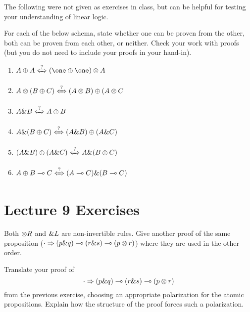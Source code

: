 \documentclass{article}
\begin{document}
The following were not given as exercises in class, but can be helpful
for testing your understanding of linear logic.

\newcommand{\eqhuh}{\xLeftrightarrow{\text{?}}}

\begin{exercise}
  For each of the below schema, state whether one can be proven from the
  other,
  both can be proven from each other, or neither.
  Check your work with proofs (but you do not need to include your proofs
  in your hand-in).
  \begin{enumerate}
    \item $A \oplus A \eqhuh (\one \oplus \one) \tensor A$
    \item $A \tensor (B \oplus C) \eqhuh (A \tensor B) \oplus (A \tensor
      C$
    \item $A \with B \eqhuh A \oplus B$
    \item $A \with (B \oplus C) \eqhuh (A \with B) \oplus (A \with C)$
    \item $(A \with B) \oplus (A \with C) \eqhuh A \with (B \oplus C)$
    \item $A \oplus B \lolli C \eqhuh (A \lolli C) \with (B \lolli C)$
  \end{enumerate}
\end{exercise}



\section{Lecture 9 Exercises}

\begin{exercise}
 Both $\otimes R$ and $\& L$ are non-invertible rules.
  Give another proof of the same proposition
  ($\cdot \Rightarrow (p \& q) \multimap (r \& s) \multimap (p \otimes r)$)
  where they are used in the other order.
\end{exercise}


\begin{exercise}
Translate your proof of
  \[
    \cdot \Rightarrow (p \& q) \multimap (r \& s) \multimap (p \otimes r)
  \]
from the previous exercise, choosing an appropriate polarization
for the atomic propositions. Explain how the structure of the proof
forces such a polarization.
\end{exercise}
\end{document}
